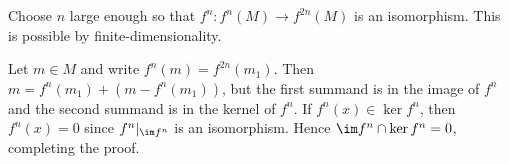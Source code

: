 Choose $n$ large enough so that $f^n\colon f^n(M)\to f^{2n}(M)$ is an isomorphism.
This is possible by finite-dimensionality.

Let  $m \in M$ and write $f^n(m) = f^{2n}(m_1)$. Then $m = f^n(m_1) + (m - f^n(m_1))$,
but the first summand is in the image of  $f^n$ and the second summand is in the
kernel of $f^n$. If $f^n(x) \in \ker f^n$, then $f^n(x) = 0$ since
$f^n|_{\im f^n}$ is an isomorphism. Hence $\im f^n\cap \ker f^n = 0$, completing
the proof.
